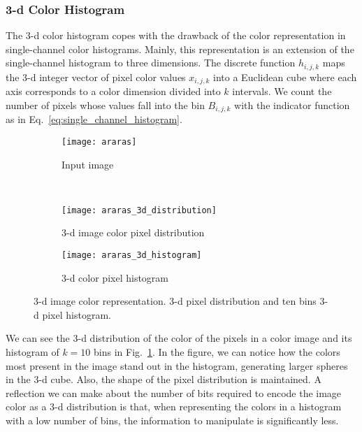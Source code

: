 \subsubsection{3-d Color Histogram}
The 3-d color histogram copes with the drawback of the color representation in single-channel color histograms. Mainly, this representation is an extension of the single-channel histogram to three dimensions. The discrete function $h_{i, j, k}$ maps the 3-d integer vector of pixel color values $x_{i, j, k}$ into a Euclidean cube where each axis corresponds to a color dimension divided into $k$ intervals. We count the number of pixels whose values fall into the bin $B_{i,j,k}$ with the indicator function as in Eq.\ \eqref{eq:single_channel_histogram}.

\begin{figure}[!ht]
    \centering
    \begin{subfigure}[b]{0.25\textwidth}
        \texttt{[image: araras]}
        \caption{Input image}
    \end{subfigure} \\
       
    \begin{subfigure}[b]{0.49\textwidth}
        \texttt{[image: araras\_3d\_distribution]}
        \caption{3-d image color pixel distribution}
    \end{subfigure} 
    \begin{subfigure}[b]{0.49\textwidth}
        \texttt{[image: araras\_3d\_histogram]}
        \caption{3-d color pixel histogram}
    \end{subfigure} 
    
    \caption{3-d image color representation. 3-d pixel distribution and ten bins 3-d pixel histogram.}\label{fig:3d_color_representation}    
\end{figure}

We can see the 3-d distribution of the color of the pixels in a color image and its histogram of $k=10$ bins in Fig.\ \ref{fig:3d_color_representation}. In the figure, we can notice how the colors most present in the image stand out in the histogram, generating larger spheres in the 3-d cube. Also, the shape of the pixel distribution is maintained. A reflection we can make about the number of bits required to encode the image color as a 3-d distribution is that, when representing the colors in a histogram with a low number of bins, the information to manipulate is significantly less. 

